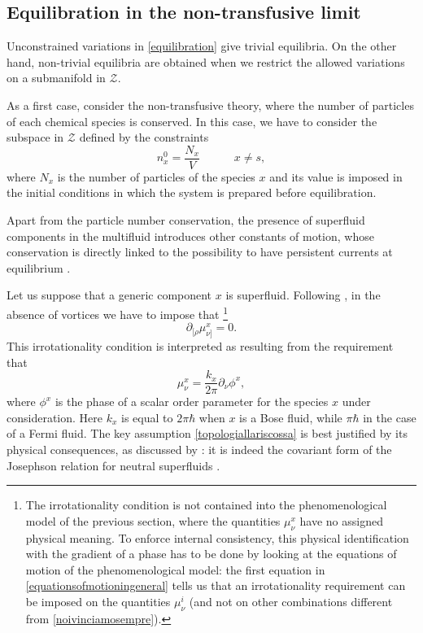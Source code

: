 \documentclass[usenatbib]{mnras}
\newcommand{\spc}{\quad \quad \quad}
\begin{document}
\subsection{Equilibration in the non-transfusive limit}
\label{Constraining the variations in the non-transfusive limit}

Unconstrained variations in \eqref{equilibration} give trivial equilibria. On the other hand, non-trivial equilibria are obtained when we restrict the allowed variations on a submanifold in  $\mathcal{Z}$.

As a first case, consider the non-transfusive theory, where the number of particles of each chemical species is conserved. In this case, we have to consider the subspace in  $\mathcal{Z}$ defined by the constraints
%
\begin{equation}\label{consnx}
n_x^0 = \dfrac{N_x}{V}  \spc  x \neq s,
\end{equation}
%
where $N_x$ is the number of particles of the species $x$ and its value is imposed in the initial conditions in which the system is prepared before equilibration. 

Apart from the particle number conservation, the presence of superfluid components in the multifluid  introduces other constants of motion, whose conservation is directly linked to the possibility to have persistent currents at equilibrium \citep{reppy_64}. 

Let us suppose that a generic component $x$ is superfluid. Following \cite{carter92}, in the absence of vortices we have to impose that
\footnote{
The irrotationality condition  is not contained into the phenomenological model of the previous section, where the quantities $\mu^x_\nu$ have no assigned physical meaning. To enforce internal consistency, this physical identification with the gradient of a phase has to be done by looking at the equations of motion of the phenomenological model: the first equation in \eqref{equationsofmotioningeneral} tells us that an irrotationality requirement can be imposed on the quantities $\mu^i_\nu$ (and not on other combinations  different from \eqref{noivinciamosempre}).
} 
%
\begin{equation}\label{nonruotanoapagarli}
\partial_{[\rho} \mu_{\nu]}^x =0 .
\end{equation}
%
This irrotationality condition is interpreted as resulting from the requirement that
%
\begin{equation}\label{topologiallariscossa}
\mu^x_\nu = \dfrac{k_x}{2\pi} \partial_\nu \phi^x,
\end{equation}
%
where $\phi^x$ is the phase of a scalar order parameter for the species $x$ under consideration. Here $k_x$ is equal to $2\pi \hbar$ when $x$ is a Bose fluid, while $\pi \hbar$ in the case of a Fermi fluid. The key assumption \eqref{topologiallariscossa} is best justified by its physical consequences, as discussed by \cite{anderson_considerations}: it is indeed the covariant form of the Josephson relation for neutral superfluids \citep{carter_macro_2006,chamel_jltp_2017}. 
\end{document}
